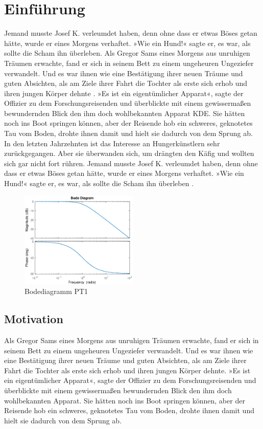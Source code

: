 \section{Einführung}
Jemand musste Josef K. verleumdet haben, denn ohne dass er etwas Böses getan hätte, wurde er eines Morgens verhaftet. »Wie ein Hund!« sagte er, es war, als sollte die Scham ihn überleben. Als Gregor Sams eines Morgens aus unruhigen Träumen erwachte, fand er sich in seinem Bett zu einem ungeheuren Ungeziefer  verwandelt. Und es war ihnen wie eine Bestätigung ihrer neuen Träume und guten Absichten, als am Ziele ihrer Fahrt die Tochter als erste sich erhob und ihren jungen Körper dehnte \cite[S.55ff]{Accardi.2010}. »Es ist ein eigentümlicher Apparat«, sagte der Offizier zu dem Forschungsreisenden und überblickte mit einem gewissermaßen bewundernden Blick den ihm doch wohlbekannten Apparat \ac{KDE}. Sie hätten noch ins Boot springen können, aber der Reisende hob ein schweres, geknotetes Tau vom Boden, drohte ihnen damit und hielt sie dadurch von dem Sprung ab. In den letzten Jahrzehnten ist das Interesse an Hungerkünstlern sehr zurückgegangen. Aber sie überwanden sich, um drängten den Käfig und wollten sich gar nicht fort rühren. Jemand musste Josef K. verleumdet haben, denn ohne dass er etwas Böses getan hätte, wurde er eines Morgens verhaftet. »Wie ein Hund!« sagte er, es war, als sollte die Scham ihn überleben \cite{Lewis.2010}.

\begin{figure}[h]
\centering \includegraphics[width=0.5\textwidth]{Bilder/PT1/PT1.eps}
\caption{Bodediagramm PT1}
\end{figure}

\subsection{Motivation}
Als Gregor Sams eines Morgens aus unruhigen Träumen erwachte, fand er sich in seinem Bett zu einem ungeheuren Ungeziefer verwandelt. Und es war ihnen wie eine Bestätigung ihrer neuen Träume und guten Absichten, als am Ziele ihrer Fahrt die Tochter als erste sich erhob und ihren jungen Körper dehnte. »Es ist ein eigentümlicher Apparat«, sagte der Offizier zu dem Forschungsreisenden und überblickte mit einem gewissermaßen bewundernden Blick den ihm doch wohlbekannten Apparat. Sie hätten noch ins Boot springen können, aber der Reisende hob ein schweres, geknotetes Tau vom Boden, drohte ihnen damit und hielt sie dadurch von dem Sprung ab.

